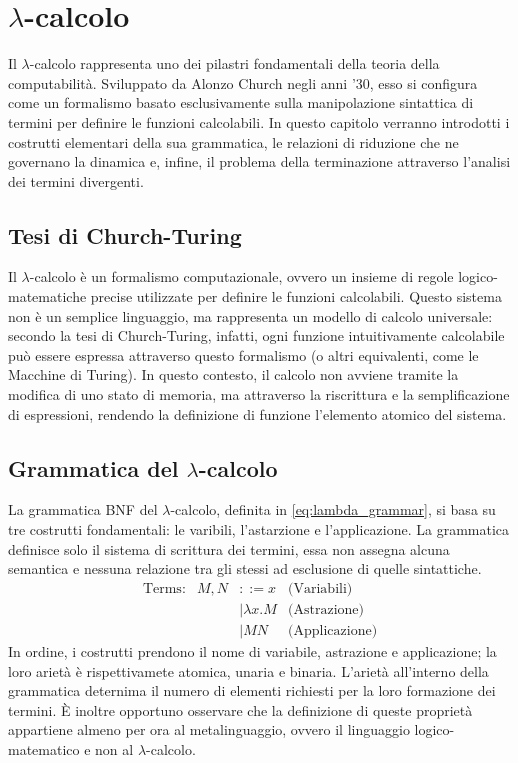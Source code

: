 \chapter{\texorpdfstring{$\lambda$}{Lambda}-calcolo}
\label{chap:lambda_calculus}

Il $\lambda$-calcolo rappresenta uno dei pilastri fondamentali della teoria della computabilità. Sviluppato da 
Alonzo Church negli anni '30, esso si configura come un formalismo basato esclusivamente sulla manipolazione 
sintattica di termini per definire le funzioni calcolabili. In questo capitolo verranno introdotti i costrutti 
elementari della sua grammatica, le relazioni di riduzione che ne governano la dinamica e, infine, il problema 
della terminazione attraverso l'analisi dei termini divergenti.

\section{Tesi di Church-Turing}
Il $\lambda$-calcolo è un formalismo computazionale, ovvero un insieme di regole logico-matematiche precise utilizzate per definire 
le funzioni calcolabili. Questo sistema non è un semplice linguaggio, ma rappresenta un modello di calcolo universale: secondo la 
tesi di Church-Turing, infatti, ogni funzione intuitivamente calcolabile può essere espressa attraverso questo formalismo (o altri 
equivalenti, come le Macchine di Turing). In questo contesto, il calcolo non avviene tramite la modifica di uno stato di memoria, 
ma attraverso la riscrittura e la semplificazione di espressioni, rendendo la definizione di funzione l'elemento atomico del sistema.

\section{Grammatica del \texorpdfstring{$\lambda$}{Lambda}-calcolo}
La grammatica BNF del $\lambda$-calcolo, definita in \eqref{eq:lambda_grammar}, si basa su tre costrutti fondamentali:
le varibili, l'astarzione e l'applicazione. La grammatica definisce solo il sistema di scrittura dei termini, 
essa non assegna alcuna semantica e nessuna relazione tra gli stessi ad esclusione di quelle sintattiche.
\begin{equation}
    \begin{array}{lrll}
        \text{Terms:}   & M, N & ::= x             & \text{(Variabili)}   \\
                        &      & \mid \lambda x. M & \text{(Astrazione)}  \\
                        &      & \mid M N          & \text{(Applicazione)}
    \end{array}
    \label{eq:lambda_grammar}
\end{equation}
In ordine, i costrutti prendono il nome di variabile, astrazione e applicazione; la loro arietà è rispettivamete atomica, unaria e binaria.
L'arietà all'interno della grammatica deternima il numero di elementi richiesti per la loro formazione dei termini. È inoltre opportuno osservare 
che la definizione di queste proprietà appartiene almeno per ora al metalinguaggio, ovvero il linguaggio logico-matematico e non al $\lambda$-calcolo.
    
